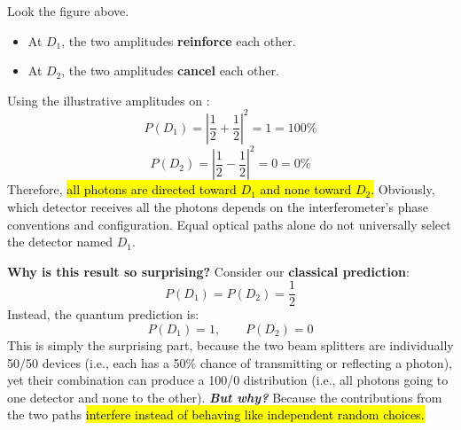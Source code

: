 \highspace
Look the figure above.
\begin{itemize}
    \item At $D_1$, the two amplitudes \textbf{reinforce} each other.
    \item At $D_2$, the two amplitudes \textbf{cancel} each other.
\end{itemize}
Using the illustrative amplitudes on :
\begin{equation*}
    P\left(D_1\right) = \left|\frac{1}{2} + \frac{1}{2}\right|^2 = 1 = 100\%
\end{equation*}
\begin{equation*}
    P\left(D_2\right) = \left|\frac{1}{2} - \frac{1}{2}\right|^2 = 0 = 0\%
\end{equation*}
Therefore, \hl{all photons are directed toward $D_1$ and none toward $D_2$.} Obviously, which detector receives all the photons depends on the interferometer's phase conventions and configuration. Equal optical paths alone do not universally select the detector named $D_1$.

\highspace
\textcolor{Green3}{ \textbf{Why is this result so surprising?}} Consider our \textbf{classical prediction}:
\begin{equation*}
    P\left(D_1\right) = P\left(D_2\right) = \frac{1}{2}
\end{equation*}
Instead, the quantum prediction is:
\begin{equation*}
    P\left(D_1\right) = 1, \qquad P\left(D_2\right) = 0
\end{equation*}
This is simply the surprising part, because the two beam splitters are individually 50/50 devices (i.e., each has a 50\% chance of transmitting or reflecting a photon), yet their combination can produce a 100/0 distribution (i.e., all photons going to one detector and none to the other). \textbf{\emph{But why?}} Because the contributions from the two paths \hl{interfere instead of behaving like independent random choices.}

